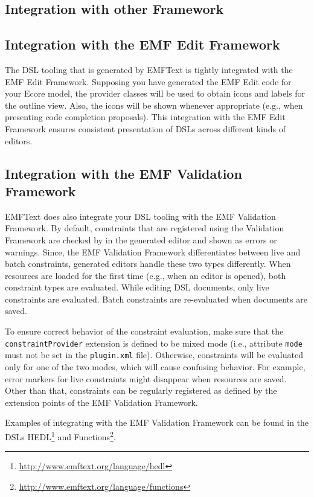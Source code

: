 \subsection{Integration with other Framework}

\subsection{Integration with the EMF Edit Framework}

The DSL tooling that is generated by EMFText is tightly integrated with the EMF
Edit Framework. Supposing you have generated the EMF Edit code for your Ecore 
model, the provider classes will be used to obtain icons and labels for the 
outline view. Also, the icons will be shown whenever appropriate (e.g., when
presenting code completion proposals). This integration with the EMF Edit 
Framework ensures consistent presentation of DSLs across different kinds of
editors.

\subsection{Integration with the EMF Validation Framework}

EMFText does also integrate your DSL tooling with the EMF Validation Framework.
By default, constraints that are registered using the Validation Framework are
checked by in the generated editor and shown as errors or warnings. Since, the
EMF Validation Framework differentiates between live and batch constraints,
generated editors handle these two types differently. When resources are loaded
for the first time (e.g., when an editor is opened), both constraint types are
evaluated. While editing DSL documents, only live constraints are evaluated.
Batch constraints are re-evaluated when documents are saved.

To ensure correct behavior of the constraint evaluation, make sure that the 
\texttt{constraintProvider} extension is defined to be mixed mode (i.e., 
attribute \texttt{mode} must not be set in the \texttt{plugin.xml} file). 
Otherwise, constraints will be evaluated only for one of the two modes, which 
will cause confusing behavior. For example, error markers for live constraints
might disappear when resources are saved. Other than that, constraints can be
regularly registered as defined by the extension points of the EMF Validation 
Framework.

Examples of integrating with the EMF Validation Framework can be found in
the DSLs HEDL\footnote{\url{http://www.emftext.org/language/hedl}} and 
Functions\footnote{\url{http://www.emftext.org/language/functions}}. 
